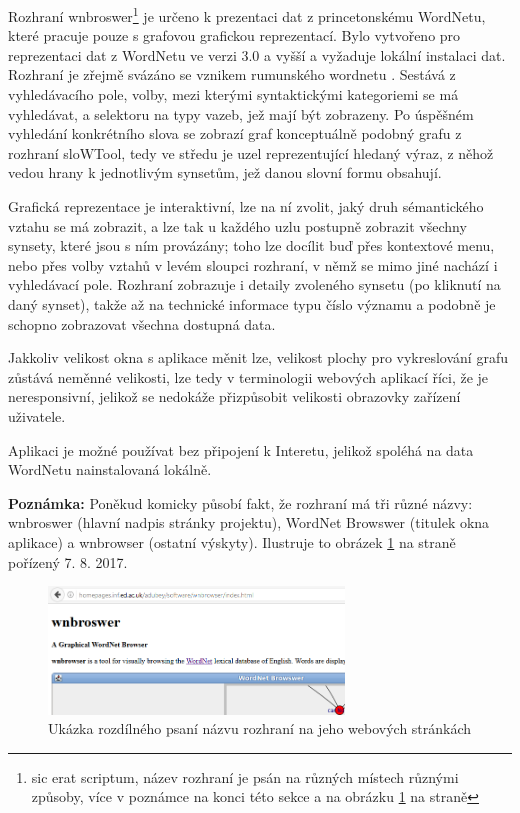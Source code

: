 \documentclass[a4paper, 11pt, oneside]{book}
\begin{document}
					Rozhraní wnbroswer\footnote{sic erat scriptum, název rozhraní je psán na různých místech různými způsoby, více v poznámce na konci této sekce a na obrázku \ref{fig:wnbroswerbadwriting} na straně \pageref{fig:wnbroswerbadwriting}} je určeno k prezentaci dat z princetonskému WordNetu, které pracuje pouze s grafovou grafickou reprezentací. Bylo vytvořeno pro reprezentaci dat z WordNetu ve verzi 3.0 a vyšší a vyžaduje lokální instalaci dat. Rozhraní je zřejmě svázáno se vznikem rumunského wordnetu \parencite{fivser2011visualizing}. Sestává z vyhledávacího pole, volby, mezi kterými syntaktickými kategoriemi se má vyhledávat, a selektoru na typy vazeb, jež mají být zobrazeny. Po úspěšném vyhledání konkrétního slova se zobrazí graf konceptuálně podobný grafu z rozhraní sloWTool, tedy ve středu je uzel reprezentující hledaný výraz, z něhož vedou hrany k jednotlivým synsetům, jež danou slovní formu obsahují. 

					Grafická reprezentace je interaktivní, lze na ní zvolit, jaký druh sémantického vztahu se má zobrazit, a lze tak u každého uzlu postupně zobrazit všechny synsety, které jsou s ním provázány; toho lze docílit buď přes kontextové menu, nebo přes volby vztahů v levém sloupci rozhraní, v němž se mimo jiné nachází i vyhledávací pole. Rozhraní zobrazuje i detaily zvoleného synsetu (po kliknutí na daný synset), takže až na technické informace typu číslo významu a podobně je schopno zobrazovat všechna dostupná data.

					Jakkoliv velikost okna s aplikace měnit lze, velikost plochy pro vykreslování grafu zůstává neměnné velikosti, lze tedy v terminologii webových aplikací říci, že je neresponsivní, jelikož se nedokáže přizpůsobit velikosti obrazovky zařízení uživatele.

					Aplikaci je možné používat bez připojení k Interetu, jelikož spoléhá na data WordNetu nainstalovaná lokálně. 

					\textbf{Poznámka:} Poněkud komicky působí fakt, že rozhraní má tři různé názvy: wnbroswer (hlavní nadpis stránky projektu), WordNet Browswer (titulek okna aplikace) a wnbrowser (ostatní výskyty). Ilustruje to obrázek \ref{fig:wnbroswerbadwriting} na straně \pageref{fig:wnbroswerbadwriting} pořízený 7. 8. 2017.

					\begin{figure}[h]
						\centering
						\includegraphics[width=0.7\textwidth]{wnbroswer.png}
						\caption{Ukázka rozdílného psaní názvu rozhraní na jeho webových stránkách}
						\label{fig:wnbroswerbadwriting}
					\end{figure}
\end{document}
